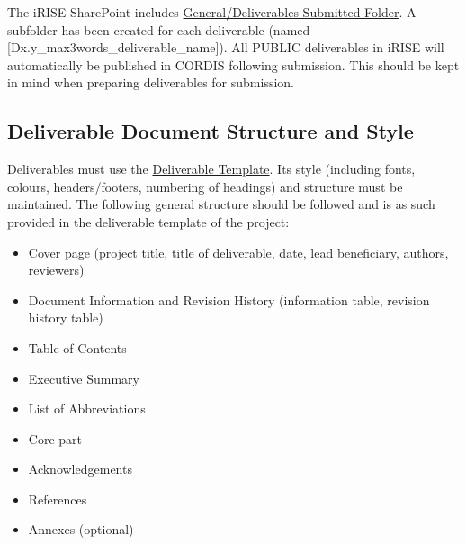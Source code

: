 \documentclass[
]{article}
\providecommand{\tightlist}{%
  \setlength{\itemsep}{0pt}\setlength{\parskip}{0pt}}
\begin{document}
The iRISE SharePoint includes \href{https://charitede.sharepoint.com/:f:/r/sites/iRISE/Shared\%20Documents/General/Deliverables\%20submitted?csf=1\&web=1\&e=i2hJoz}{General/Deliverables Submitted
Folder}.
A subfolder has been created for each deliverable (named
{[}Dx.y\_max3words\_deliverable\_name{]}). All PUBLIC deliverables in iRISE
will automatically be published in CORDIS following submission. This
should be kept in mind when preparing deliverables for submission.

\hypertarget{deliverable-document-structure-and-style}{%
\subsection{Deliverable Document Structure and Style}\label{deliverable-document-structure-and-style}}

Deliverables must use the \href{https://charitede.sharepoint.com/:w:/r/sites/iRISE/Shared\%20Documents/General/iRISE\%20Dissemination_Communication_Templates/Templates/DeliverableTemplate.docx?d=w4ec2474158ab425f86655df0f923297d\&csf=1\&web=1\&e=drgFm9}{Deliverable
Template}.
Its style (including fonts, colours, headers/footers, numbering of
headings) and structure must be maintained. The following general
structure should be followed and is as such provided in the deliverable
template of the project:

\begin{itemize}
\tightlist
\item
  Cover page (project title, title of deliverable, date, lead
  beneficiary, authors, reviewers)\\
\item
  Document Information and Revision History (information table,
  revision history table)\\
\item
  Table of Contents\\
\item
  Executive Summary\\
\item
  List of Abbreviations\\
\item
  Core part\\
\item
  Acknowledgements\\
\item
  References\\
\item
  Annexes (optional)
\end{itemize}
\end{document}

